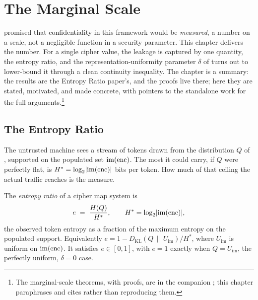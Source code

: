 
\chapter{The Marginal Scale}
\label{ch:marginal-scale}

 promised that confidentiality in this
framework would be \emph{measured}, a number on a scale, not a negligible
function in a security parameter. This chapter delivers the number. For a
single cipher value, the leakage is captured by one quantity, the entropy
ratio, and the representation-uniformity parameter $\delta$ of
 turns out to lower-bound it through a clean continuity
inequality. The chapter is a summary: the results are the Entropy Ratio
paper's, and the proofs live there; here they are stated, motivated, and
made concrete, with pointers to the standalone work for the full
arguments.\footnote{The marginal-scale theorems, with proofs, are in the
companion \cite{towell2026maxconf}; this chapter paraphrases and cites rather
than reproducing them.}

\section{The Entropy Ratio}
\label{sec:entropy-ratio}

The untrusted machine sees a stream of tokens drawn from the distribution
$Q$ of , supported on the populated set
$\mathrm{im}(\operatorname{enc})$. The most it could carry, if $Q$ were perfectly flat, is
$H^{*} = \log_2 \lvert \mathrm{im}(\operatorname{enc})\rvert$ bits per token. How much of
that ceiling the actual traffic reaches is the measure.

\begin{definition}
\label{def:entropy-ratio}
The \emph{entropy ratio} of a cipher map system is
\[
  e \;=\; \frac{H(Q)}{H^{*}},
  \qquad H^{*} = \log_2 \lvert \mathrm{im}(\operatorname{enc})\rvert,
\]
the observed token entropy as a fraction of the maximum entropy on the
populated support. Equivalently $e = 1 - D_{\mathrm{KL}}(Q \,\|\,
U_{\mathrm{im}})/H^{*}$, where $U_{\mathrm{im}}$ is uniform on
$\mathrm{im}(\operatorname{enc})$. It satisfies $e \in [0, 1]$, with $e = 1$ exactly when
$Q = U_{\mathrm{im}}$, the perfectly uniform, $\delta = 0$ case.
\end{definition}

